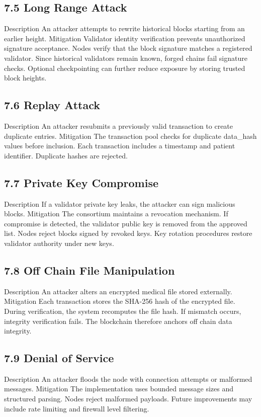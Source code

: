 \subsection*{7.5 Long Range Attack}
Description
An attacker attempts to rewrite historical blocks starting from an earlier height.
Mitigation
Validator identity verification prevents unauthorized signature acceptance. Nodes verify that the block signature matches a registered validator. Since historical validators remain known, forged chains fail signature checks.
Optional checkpointing can further reduce exposure by storing trusted block heights.

\subsection*{7.6 Replay Attack}
Description
An attacker resubmits a previously valid transaction to create duplicate entries.
Mitigation
The transaction pool checks for duplicate data_hash values before inclusion. Each transaction includes a timestamp and patient identifier. Duplicate hashes are rejected.

\subsection*{7.7 Private Key Compromise}
Description
If a validator private key leaks, the attacker can sign malicious blocks.
Mitigation
The consortium maintains a revocation mechanism. If compromise is detected, the validator public key is removed from the approved list. Nodes reject blocks signed by revoked keys. Key rotation procedures restore validator authority under new keys.

\subsection*{7.8 Off Chain File Manipulation}
Description
An attacker alters an encrypted medical file stored externally.
Mitigation
Each transaction stores the SHA-256 hash of the encrypted file. During verification, the system recomputes the file hash. If mismatch occurs, integrity verification fails. The blockchain therefore anchors off chain data integrity.

\subsection*{7.9 Denial of Service}
Description
An attacker floods the node with connection attempts or malformed messages.
Mitigation
The implementation uses bounded message sizes and structured parsing. Nodes reject malformed payloads. Future improvements may include rate limiting and firewall level filtering.

